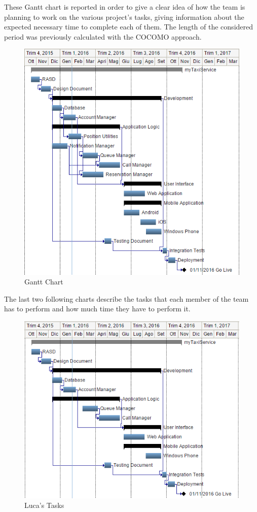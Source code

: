 \documentclass[a4paper]{article}
\begin{document}
\vfill

\newpage

These Gantt chart is reported in order to give a clear idea of how the team is planning to work on the various project's tasks, giving information about the expected necessary time to complete each of them. The length of the considered period was previously calculated with the COCOMO approach.

\vfill

\begin{figure}[H]
\includegraphics[width=.8\textwidth]{GANTT_CHART}
\centering
\caption{Gantt Chart}
\label{fig:GANTT_CHART}
\end{figure}

\vfill

\newpage

The last two following charts describe the tasks that each member of the team has to perform and how much time they have to perform it.

\begin{figure}[H]
\includegraphics[width=.7\textwidth]{GANTT_CHART_LUCA}
\centering
\caption{Luca's Tasks}
\label{fig:GANTT_CHART_LUCA}
\end{figure}
\end{document}
